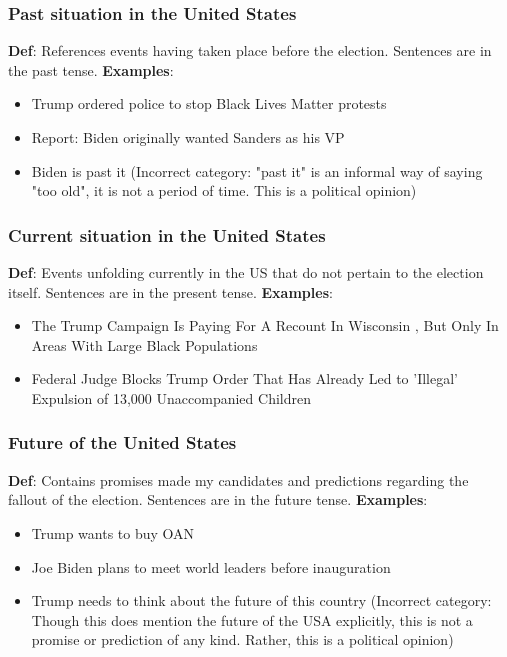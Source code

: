 \documentclass[11pt]{article}
\begin{document}
\subsubsection*{Past situation in the United States}
\textbf{Def}: References events having taken place before the election. Sentences are in the past tense. 
\newline
\textbf{Examples}: 
\begin{itemize}
    \item Trump ordered police to stop Black Lives Matter protests
    \item Report: Biden originally wanted Sanders as his VP
    \item Biden is past it (Incorrect category: "past it" is an informal way of saying "too old", it is not a period of time. This is a political opinion)
\end{itemize}
\subsubsection*{Current situation in the United States}
\textbf{Def}: Events unfolding currently in the US that do not pertain to the election itself. Sentences are in the present tense.
\newline
\textbf{Examples}: 
\begin{itemize}
    \item The Trump Campaign Is Paying For A Recount In Wisconsin ‚ But Only In Areas With Large Black Populations
    \item Federal Judge Blocks Trump Order That Has Already Led to 'Illegal' Expulsion of 13,000 Unaccompanied Children
\end{itemize}
\subsubsection*{Future of the United States}
\textbf{Def}: Contains promises made my candidates and predictions regarding the fallout of the election. Sentences are in the future tense.
\newline
\textbf{Examples}: 
\begin{itemize}
    \item Trump wants to buy OAN
    \item Joe Biden plans to meet world leaders before inauguration
    \item Trump needs to think about the future of this country (Incorrect category: Though this does mention the future of the USA explicitly, this is not a promise or prediction of any kind. Rather, this is a political opinion)
\end{itemize}
\end{document}
